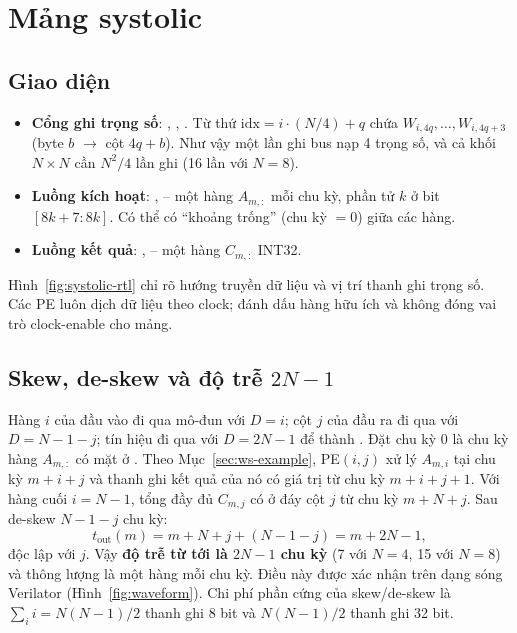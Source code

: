 \section{Mảng systolic }
\subsection{Giao diện}
\begin{itemize}
  \item \textbf{Cổng ghi trọng số}: , , . Từ thứ $\text{idx}=i\cdot(N/4)+q$ chứa $W_{i,4q},\dots,W_{i,4q+3}$ (byte $b$ $\to$ cột $4q+b$). Như vậy một lần ghi bus nạp 4 trọng số, và cả khối $N\times N$ cần $N^2/4$ lần ghi (16 lần với $N=8$).
  \item \textbf{Luồng kích hoạt}: ,  -- một hàng $A_{m,:}$ mỗi chu kỳ, phần tử $k$ ở bit $[8k+7:8k]$. Có thể có ``khoảng trống'' (chu kỳ $=0$) giữa các hàng.
  \item \textbf{Luồng kết quả}: ,  -- một hàng $C_{m,:}$ INT32.
\end{itemize}

Hình~\ref{fig:systolic-rtl} chỉ rõ hướng truyền dữ liệu và vị trí thanh ghi trọng số. Các PE luôn dịch dữ liệu theo clock;  đánh dấu hàng hữu ích và không đóng vai trò clock-enable cho mảng.


\subsection{Skew, de-skew và độ trễ \texorpdfstring{$2N-1$}{2N-1}}
\label{sec:latency}
Hàng $i$ của đầu vào đi qua mô-đun  với $D=i$; cột $j$ của đầu ra đi qua  với $D=N-1-j$; tín hiệu  đi qua  với $D=2N-1$ để thành . Đặt chu kỳ $0$ là chu kỳ hàng $A_{m,:}$ có mặt ở . Theo Mục~\ref{sec:ws-example}, PE$(i,j)$ xử lý $A_{m,i}$ tại chu kỳ $m+i+j$ và thanh ghi kết quả của nó có giá trị từ chu kỳ $m+i+j+1$. Với hàng cuối $i=N-1$, tổng đầy đủ $C_{m,j}$ có ở đáy cột $j$ từ chu kỳ $m+N+j$. Sau de-skew $N-1-j$ chu kỳ:
\begin{equation}
  t_\text{out}(m) = m + N + j + (N-1-j) = m + 2N - 1,
\end{equation}
độc lập với $j$. Vậy \textbf{độ trễ từ  tới  là $2N-1$ chu kỳ} (7 với $N=4$, 15 với $N=8$) và thông lượng là một hàng mỗi chu kỳ. Điều này được xác nhận trên dạng sóng Verilator (Hình~\ref{fig:waveform}). Chi phí phần cứng của skew/de-skew là $\sum_{i}i=N(N-1)/2$ thanh ghi 8 bit và $N(N-1)/2$ thanh ghi 32 bit.

